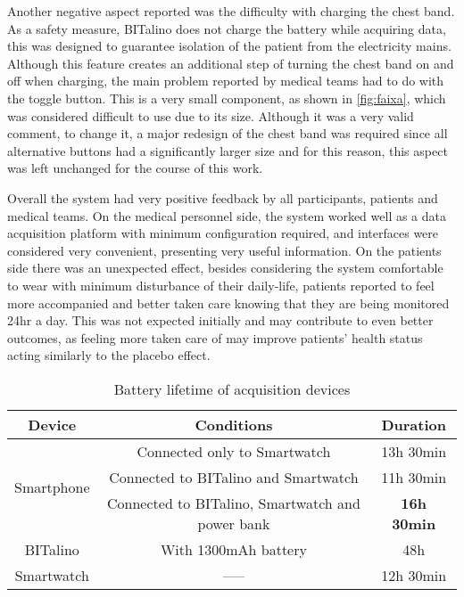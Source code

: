 Another negative aspect reported was the difficulty with charging the chest band. As a safety measure, BITalino does not charge the battery while acquiring data, this was designed to guarantee isolation of the patient from the electricity mains. Although this feature creates an additional step of turning the chest band on and off when charging, the main problem reported by medical teams had to do with the toggle button. This is a very small component, as shown in \cref{fig:faixa}, which was considered difficult to use due to its size. Although it was a very valid comment, to change it, a major redesign of the chest band was required since all alternative buttons had a significantly larger size and for this reason, this aspect was left unchanged for the course of this work.

Overall the system had very positive feedback by all participants, patients and medical teams. On the medical personnel side, the system worked well as a data acquisition platform with minimum configuration required, and interfaces were considered very convenient, presenting very useful information. On the patients side there was an unexpected effect, besides considering the system comfortable to wear with minimum disturbance of their daily-life, patients reported to feel more accompanied and better taken care knowing that they are being monitored 24hr a day. This was not expected initially and may contribute to even better outcomes, as feeling more taken care of may improve patients' health status acting similarly to the placebo effect.

\begin{table}[!h]
	
	\centering
	\caption{Battery lifetime of acquisition devices}
	\label{table:battery}
	\begin{tabular}{|c|c|c|}
		\hline
		\textbf{Device}		 		&
		\textbf{Conditions}		&
		\textbf{Duration} \\ \hline
		\multirow{3}{*}{Smartphone}      &  Connected only to Smartwatch & 13h 30min  \\ \cline{2-3} 
		& Connected to BITalino and Smartwatch                                 &    11h 30min      \\ \cline{2-3} 
		& Connected to BITalino, Smartwatch and power bank                                                              &  \textbf{16h 30min}        \\ \hline
		BITalino
		& With 1300mAh battery                                                                              & 48h     \\ \hline
		Smartwatch                        & -----                                                                                             &  12h 30min        \\ \hline
	\end{tabular}
\end{table}

